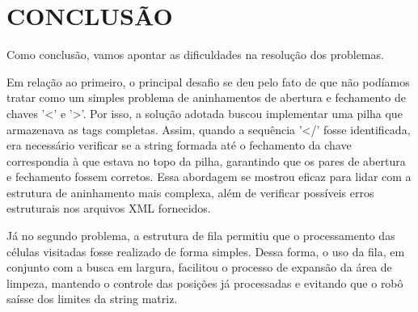 \section{CONCLUSÃO}

Como conclusão, vamos apontar as dificuldades na resolução dos problemas. 

Em relação ao primeiro, o principal desafio se deu pelo fato de que não podíamos tratar como um simples problema de aninhamentos de abertura e fechamento de chaves '<' e '>'. Por isso, a solução adotada buscou implementar uma pilha que armazenava as tags completas. Assim, quando a sequência '</' fosse identificada, era necessário verificar se a string formada até o fechamento da chave correspondia à que estava no topo da pilha, garantindo que os pares de abertura e fechamento fossem corretos. Essa abordagem se mostrou eficaz para lidar com a estrutura de aninhamento mais complexa, além de verificar possíveis erros estruturais nos arquivos XML fornecidos.

Já no segundo problema, a estrutura de fila permitiu que o processamento das células visitadas fosse realizado de forma simples. Dessa forma, o uso da fila, em conjunto com a busca em largura, facilitou o processo de expansão da área de limpeza, mantendo o controle das posições já processadas e evitando que o robô saísse dos limites da string matriz.
